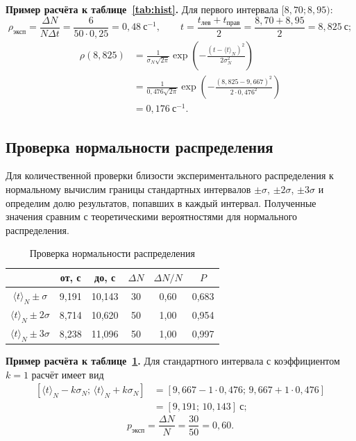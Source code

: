 \documentclass[a4paper,14pt]{extarticle}
\begin{document}
	\noindent\textbf{Пример расчёта к таблице~\ref{tab:hist}.} Для первого интервала $[8{,}70; 8{,}95)$:
	\[
	\rho_{\text{эксп}} = \frac{\Delta N}{N\Delta t}
	= \frac{6}{50\cdot0{,}25} = 0{,}48\ \text{с}^{-1},
	\qquad
	t = \frac{t_{\text{лев}}+t_{\text{прав}}}{2}
	= \frac{8{,}70+8{,}95}{2} = 8{,}825\ \text{с};
	\]
	\[
	\begin{aligned}
	\rho(8{,}825) &= \frac{1}{\sigma_N\sqrt{2\pi}}
	\exp\left(-\frac{(t-\langle t \rangle_N)^2}{2\sigma_N^2}\right) \\
	&= \frac{1}{0{,}476\sqrt{2\pi}}
	\exp\left(-\frac{(8{,}825-9{,}667)^2}{2\cdot0{,}476^2}\right) \\
	&= 0{,}176\ \text{с}^{-1}.
	\end{aligned}
	\]

	\clearpage
	\subsection{Проверка нормальности распределения}
	
	Для количественной проверки близости экспериментального распределения к нормальному вычислим границы стандартных интервалов \(\pm \sigma\), \(\pm 2\sigma\), \(\pm 3\sigma\) и определим долю результатов, попавших в каждый интервал. Полученные значения сравним с теоретическими вероятностями для нормального распределения.
	
	\begingroup
	\renewcommand{\arraystretch}{1.6}
	\begin{table}[h!]
		\centering
		\caption{Проверка нормальности распределения}
		\label{tab:norm}
		\begin{tabular}{|c|c|c|c|c|c|}
			\hline
			 & от, с & до, с & \(\Delta N\) & \(\Delta N / N\) & \(P\) \\ \hline
			\(\langle t \rangle_N \pm \sigma\) & 9,191 & 10,143 & 30 & 0,60 & 0,683 \\ \hline
			\(\langle t \rangle_N \pm 2\sigma\) & 8,714 & 10,620 & 50 & 1,00 & 0,954 \\ \hline
			\(\langle t \rangle_N \pm 3\sigma\) & 8,238 & 11,096 & 50 & 1,00 & 0,997 \\ \hline
		\end{tabular}
	\end{table}
	\endgroup

	\noindent\textbf{Пример расчёта к таблице~\ref{tab:norm}.}
	Для стандартного интервала с коэффициентом $k=1$ расчёт имеет вид
	\[
	\begin{aligned}
	\left[\langle t \rangle_N-k\sigma_N;\,\langle t \rangle_N+k\sigma_N\right]
	&= [9{,}667-1\cdot0{,}476;\,9{,}667+1\cdot0{,}476] \\
	&= [9{,}191;\,10{,}143]\ \text{с};
	\end{aligned}
	\]
	\[
	p_{\text{эксп}}=\frac{\Delta N}{N}=\frac{30}{50}=0{,}60.
	\]
\end{document}
